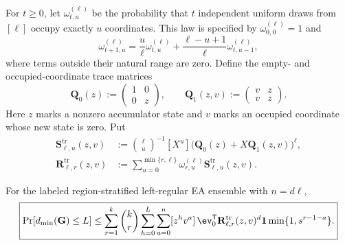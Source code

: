 For $t\geq0$, let $\omega^{(\ell)}_{t,u}$ be the probability that $t$
independent uniform draws from $[\ell]$ occupy exactly $u$ coordinates.  This
law is specified by $\omega^{(\ell)}_{0,0}=1$ and
\begin{equation}
 \omega^{(\ell)}_{t+1,u}
 =\frac{u}{\ell}\omega^{(\ell)}_{t,u}
  +\frac{\ell-u+1}{\ell}\omega^{(\ell)}_{t,u-1},
 \label{eq:prime-ea-regular-occupancy-law}
\end{equation}
where terms outside their natural range are zero.  Define the empty- and
occupied-coordinate trace matrices
\begin{equation}
 \mathbf Q_0(z):=
 \begin{pmatrix}1&0\\0&z\end{pmatrix},
 \qquad
 \mathbf Q_1(z,v):=
 \begin{pmatrix}v&z\\v&z\end{pmatrix}.
 \label{eq:prime-ea-regular-trace-inputs}
\end{equation}
Here $z$ marks a nonzero accumulator state and $v$ marks an occupied
coordinate whose new state is zero.  Put
\begin{align}
 \mathbf S^{\mathrm{tr}}_{\ell,u}(z,v)
 &:=\binom{\ell}{u}^{-1}[X^u]
   \bigl(\mathbf Q_0(z)+X\mathbf Q_1(z,v)\bigr)^\ell,
 \label{eq:prime-ea-regular-trace-slice}\\
 \mathbf R^{\mathrm{tr}}_{\ell,r}(z,v)
 &:=\sum_{u=0}^{\min\{r,\ell\}}
   \omega^{(\ell)}_{r,u}\mathbf S^{\mathrm{tr}}_{\ell,u}(z,v).
 \label{eq:prime-ea-regular-trace-region}
\end{align}

\begin{theorem}
\label{thm:prime-ea-regular-projective-trace}
For the labeled region-stratified left-regular EA ensemble with $n=d\ell$,
\begin{equation}
 \boxed{
 \Pr[d_{\min}(\G)\leq L]
 \leq
 \sum_{r=1}^k\binom{k}{r}
 \sum_{h=0}^L\sum_{a=0}^n[z^hv^a]\,
 \ev_0^{\mathsf T}
 \mathbf R^{\mathrm{tr}}_{\ell,r}(z,v)^d\boldsymbol 1
 \min\{1,s^{r-1-a}\}.
 }
 \label{eq:prime-ea-regular-projective-trace}
\end{equation}
\end{theorem}

